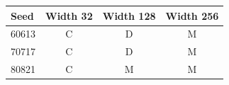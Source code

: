 \begin{tabular}{lccc}
\toprule
Seed & Width 32 & Width 128 & Width 256 \\
\midrule
60613 & C & D & M \\
70717 & C & D & M \\
80821 & C & M & M \\
\bottomrule
\end{tabular}
